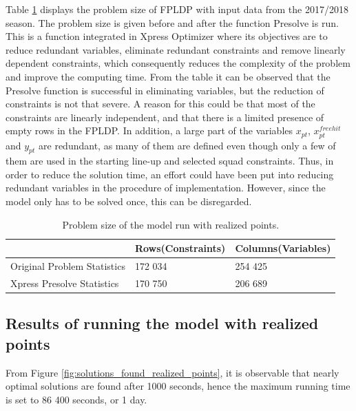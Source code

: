 Table \ref{tab:computational_statistics} displays the problem size of FPLDP with input data from the 2017/2018 season. The problem size is given before and after the function Presolve is run. This is a function integrated in Xpress Optimizer where its objectives are to reduce redundant variables, eliminate redundant constraints and remove linearly dependent constraints, which consequently reduces the complexity of the problem and improve the computing time. From the table it can be observed that the Presolve function is successful in eliminating variables, but the reduction of constraints is not that severe. A reason for this could be that most of the constraints are linearly independent, and that there is a limited presence of empty rows in the FPLDP. In addition, a large part of the variables $x_{pt}$, $x_{pt}^{freehit}$ and $y_{pt}$ are redundant, as many of them are defined even though only a few of them are used in the starting line-up and selected squad constraints. Thus, in order to reduce the solution time, an effort could have been put into reducing redundant variables in the procedure of implementation. However, since the model only has to be solved once, this can be disregarded. 


\begin{table}[H]
\centering
\begin{tabular}{@{}lll@{}}
\toprule
                            & Rows(Constraints)    & Columns(Variables) 
                            \\ \midrule
Original Problem Statistics & 172 034 & 254 425   \\
Xpress Presolve Statistics  & 170 750 & 206 689   \\ 
\bottomrule
\end{tabular}
\caption{Problem size of the model run with realized points.}
\label{tab:computational_statistics}
\end{table}


\subsection{Results of running the model with realized points}

From Figure \ref{fig:solutions_found_realized_points}, it is observable that nearly optimal solutions are found after 1000 seconds, hence the maximum running time is set to 86 400 seconds, or 1 day. 

